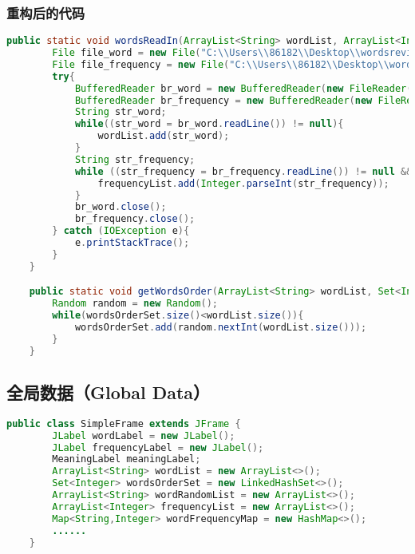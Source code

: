 \documentclass[a4paper]{article}
\begin{document}
\subsubsection*{重构后的代码}
\begin{lstlisting}[language={java}]
    public static void wordsReadIn(ArrayList<String> wordList, ArrayList<Integer> frequencyList){
        File file_word = new File("C:\\Users\\86182\\Desktop\\wordsreview.txt");
        File file_frequency = new File("C:\\Users\\86182\\Desktop\\wordsFrequency.txt");
        try{
            BufferedReader br_word = new BufferedReader(new FileReader(file_word));
            BufferedReader br_frequency = new BufferedReader(new FileReader(file_frequency));
            String str_word;
            while((str_word = br_word.readLine()) != null){
                wordList.add(str_word);
            }
            String str_frequency;
            while ((str_frequency = br_frequency.readLine()) != null && !str_frequency.equals("")){
                frequencyList.add(Integer.parseInt(str_frequency));
            }
            br_word.close();
            br_frequency.close();
        } catch (IOException e){
            e.printStackTrace();
        }
    }

    public static void getWordsOrder(ArrayList<String> wordList, Set<Integer> wordsOrderSet){
        Random random = new Random();
        while(wordsOrderSet.size()<wordList.size()){
            wordsOrderSet.add(random.nextInt(wordList.size()));
        }
    }
\end{lstlisting}

\subsection{全局数据（Global Data）}
\begin{lstlisting}[language={java}]
    public class SimpleFrame extends JFrame {
        JLabel wordLabel = new JLabel();
        JLabel frequencyLabel = new JLabel();
        MeaningLabel meaningLabel;
        ArrayList<String> wordList = new ArrayList<>();
        Set<Integer> wordsOrderSet = new LinkedHashSet<>();
        ArrayList<String> wordRandomList = new ArrayList<>();
        ArrayList<Integer> frequencyList = new ArrayList<>();
        Map<String,Integer> wordFrequencyMap = new HashMap<>();
        ......
    }
\end{lstlisting}
\end{document}
